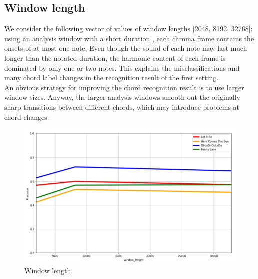 \documentclass[
	12pt, %
]{fphw}
\begin{document}
\subsection{Window length}
We consider the following vector of values of window lengths [2048, 8192, 32768]:  using an analysis window with a short duration , each chroma frame contains the onsets of at most one note. Even though the sound of each note may last much longer than the notated duration, the harmonic content of each frame is dominated by only one or two notes. This explains the misclassifications and many chord label changes in the recognition result of the first setting. \\
An obvious strategy for improving the chord recognition result is to use larger window sizes. Anyway, the larger analysis windows smooth out the originally sharp transitions between different chords, which may introduce problems at chord changes.\\

\begin{figure}[H]
 \centering
 \includegraphics[scale=1]{./images/5_window_precision.png}
 \caption{Window length}
\end{figure}

\end{document}
